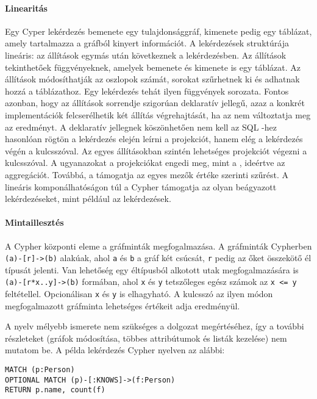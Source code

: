 \paragraph{Linearitás}
Egy Cyper lekérdezés bemenete egy tulajdonsággráf, kimenete pedig egy táblázat, amely tartalmazza a gráfból kinyert információt. A lekérdezések struktúrája lineáris: az állítások egymás után következnek a lekérdezésben. Az állítások tekinthetőek függvényeknek, amelyek bemenete és kimenete is egy táblázat. Az állítások módosíthatják az oszlopok számát, sorokat szűrhetnek ki és adhatnak hozzá a táblázathoz. Egy lekérdezés tehát ilyen függvények sorozata. Fontos azonban, hogy az állítások sorrendje szigorúan deklaratív jellegű, azaz a konkrét implementációk felcserélhetik két állítás végrehajtását, ha az nem változtatja meg az eredményt. A deklaratív jellegnek köszönhetően nem kell az SQL -hez hasonlóan rögtön a lekérdezés elején leírni a projekciót, hanem elég a lekérdezés végén a  kulcsszóval. Az egyes állításokban szintén lehetséges projekciót végezni a  kulcsszóval. A  ugyanazokat a projekciókat engedi meg, mint a , ideértve az aggregációt. Továbbá, a  támogatja az egyes mezők értéke szerinti szűrést. A lineáris komponálhatóságon túl a Cypher támogatja az olyan beágyazott lekérdezéseket, mint például az  lekérdezések.

\paragraph{Mintaillesztés}
A Cypher központi eleme a gráfminták megfogalmazása. A gráfminták Cypherben \texttt{(a)-[r]->(b)} alakúak, ahol \texttt{a} és \texttt{b} a gráf két csúcsát, \texttt{r} pedig az őket összekötő él típusát jelenti. Van lehetőség egy éltípusból alkotott utak megfogalmazására is \texttt{(a)-[r*x..y]->(b)} formában, ahol \texttt{x} és \texttt{y} tetszőleges egész számok az \texttt{x <= y} feltétellel. Opcionálisan \texttt{x} és \texttt{y} is elhagyható. A  kulcsszó az ilyen módon megfogalmazott gráfminta lehetséges értékeit adja eredményül.

A nyelv mélyebb ismerete nem szükséges a dolgozat megértéséhez, így a további részleteket (gráfok módosítása, többes attribútumok és listák kezelése) nem mutatom be. A példa lekérdezés Cypher nyelven az alábbi:

\vspace{1.5ex}

\noindent\begin{minipage}{\textwidth}
\begin{lstlisting}[frame=single,label=listing:cypher-example,caption=Cypher példakód]
MATCH (p:Person)
OPTIONAL MATCH (p)-[:KNOWS]->(f:Person)
RETURN p.name, count(f)
\end{lstlisting}
\end{minipage}

